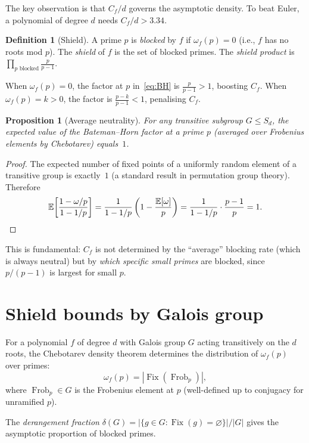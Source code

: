 \documentclass[11pt,a4paper]{article}
\newtheorem{proposition}[theorem]{Proposition}
\theoremstyle{definition}
\newtheorem{definition}[theorem]{Definition}
\theoremstyle{remark}
\newcommand{\Fix}{\operatorname{Fix}}
\newcommand{\Frob}{\operatorname{Frob}}
\begin{document}
The key observation is that $C_f/d$ governs the asymptotic density.
To beat Euler, a polynomial of degree $d$ needs $C_f/d > 3.34$.

\begin{definition}[Shield]
A prime $p$ is \emph{blocked} by $f$ if $\omega_f(p) = 0$ (i.e., $f$ has no roots mod $p$).
The \emph{shield} of $f$ is the set of blocked primes.
The \emph{shield product} is $\prod_{p \text{ blocked}} \frac{p}{p-1}$.
\end{definition}

When $\omega_f(p) = 0$, the factor at $p$ in~\eqref{eq:BH} is $\frac{p}{p-1} > 1$, boosting $C_f$.
When $\omega_f(p) = k > 0$, the factor is $\frac{p-k}{p-1} < 1$, penalising $C_f$.

\begin{proposition}[Average neutrality]\label{prop:neutral}
For any transitive subgroup $G \leq S_d$, the expected value of the Bateman--Horn factor at a prime $p$ (averaged over Frobenius elements by Chebotarev) equals~$1$.
\end{proposition}

\begin{proof}
The expected number of fixed points of a uniformly random element of a transitive group is exactly~$1$ (a standard result in permutation group theory).
Therefore
\[
\mathbb{E}\!\left[\frac{1 - \omega/p}{1 - 1/p}\right]
= \frac{1}{1-1/p}\left(1 - \frac{\mathbb{E}[\omega]}{p}\right)
= \frac{1}{1-1/p}\cdot\frac{p-1}{p}
= 1. \qedhere
\]
\end{proof}

This is fundamental: $C_f$ is not determined by the ``average'' blocking rate (which is always neutral) but by \emph{which specific small primes} are blocked, since $p/(p-1)$ is largest for small $p$.


\section{Shield bounds by Galois group}\label{sec:shield}

For a polynomial $f$ of degree $d$ with Galois group $G$ acting transitively on the $d$ roots, the Chebotarev density theorem determines the distribution of $\omega_f(p)$ over primes:
\[
\omega_f(p) = |\Fix(\Frob_p)|,
\]
where $\Frob_p \in G$ is the Frobenius element at $p$ (well-defined up to conjugacy for unramified $p$).

The \emph{derangement fraction} $\delta(G) = |\{g \in G : \Fix(g) = \varnothing\}|/|G|$ gives the asymptotic proportion of blocked primes.
\end{document}
